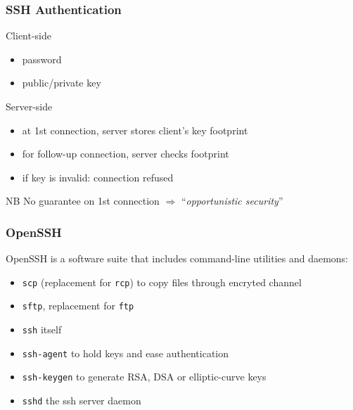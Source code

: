 \documentclass[
hyperref={pdfpagelabels=false}
,xcolor=table
]
{beamer}
\begin{document}
\begin{frame}
  \frametitle{SSH Authentication}
  \begin{block}{Client-side}
  \begin{itemize}
  \item password
  \item public/private key
  \end{itemize}
\end{block}

\begin{block}{Server-side}
  \begin{itemize}
  \item at 1st connection, server stores client's key footprint
  \item for follow-up connection, server checks footprint
  \item if key is invalid: connection refused
  \end{itemize}
\end{block}

\begin{block}{NB}
  No guarantee on 1st connection $\Longrightarrow$ ``\textit{opportunistic security}''
\end{block}
\end{frame}


\begin{frame}
  \frametitle{OpenSSH}
  OpenSSH is a software suite that includes command-line utilities and daemons:
  \begin{itemize}
  \item \texttt{scp} (replacement for \texttt{rcp}) to copy files through encryted channel
  \item \texttt{sftp}, replacement for \texttt{ftp}
  \item \texttt{ssh} itself
  \item \texttt{ssh-agent} to hold keys and ease authentication
  \item \texttt{ssh-keygen} to generate RSA, DSA or elliptic-curve keys
  \item \texttt{sshd} the ssh server daemon
  \end{itemize}
\end{frame}
\end{document}
